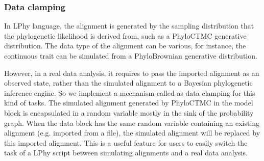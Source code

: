 \documentclass[10pt,letterpaper,table]{article}
\begin{document}
{\subsubsection{Data clamping}
\label{sec:dataclamping}
In LPhy language, the alignment is generated by the sampling distribution that the phylogenetic likelihood is derived from, such as a PhyloCTMC generative distribution. The data type of the alignment can be various, for instance, the continuous trait can be simulated from a PhyloBrownian generative distribution. 

However, in a real data analysis, it requires to pass the imported alignment as an observed state, rather than the simulated alignment to a Bayesian phylogenetic inference engine. So we implement a mechanism called as data clamping for this kind of tasks. 
The simulated alignment generated by PhyloCTMC in the model block is encapsulated in a random variable mostly in the sink of the probability graph. 
When the data block has the same random variable containing an existing alignment (e.g. imported from a file), the simulated alignment will be replaced by this imported alignment. 
This is a useful feature for users to easily switch the task of a LPhy script between simulating alignments and a real data analysis. 







}
\end{document}
